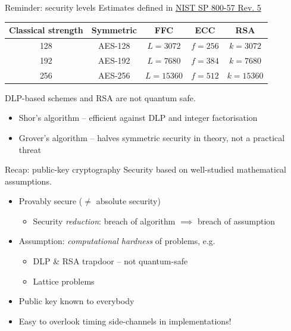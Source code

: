 \begin{frame}{Reminder: security levels}
  Estimates defined in \href{https://csrc.nist.gov/pubs/sp/800/57/pt1/r5/final}{NIST SP 800-57 Rev. 5}

  \pause
  \begin{center}
  \begin{tabular}{@{}ccccc@{}}
    Classical strength & Symmetric & FFC & ECC & RSA\\
    \midrule
    128 & AES-128 & $L = 3072$  & $f = 256$ & $k = 3072$\\
    192 & AES-192 & $L = 7680$  & $f = 384$ & $k = 7680$\\
    256 & AES-256 & $L = 15360$ & $f = 512$ & $k = 15360$
  \end{tabular}
  \end{center}

  \pause
  DLP-based schemes and RSA are \alert{not quantum safe}.
  \pause
  \begin{itemize}
    \item Shor's algorithm -- efficient against DLP and integer factorisation
    \item Grover's algorithm -- halves symmetric security in theory, not a practical threat
  \end{itemize}
\end{frame}

\begin{frame}{Recap: public-key cryptography}
  Security based on well-studied mathematical assumptions.
  \begin{itemize}[<+(1)->]
    \item Provably secure ($\neq$ absolute security)
    \begin{itemize}
      \item Security \emph{reduction}: breach of algorithm $\implies$ breach of assumption
    \end{itemize}
    \item Assumption: \emph{computational hardness} of problems, e.g.
    \begin{itemize}
      \item DLP \& RSA trapdoor -- not quantum-safe
      \item Lattice problems
    \end{itemize}
    \item Public key known to everybody
    \item Easy to overlook timing side-channels in implementations!
  \end{itemize}
\end{frame}

